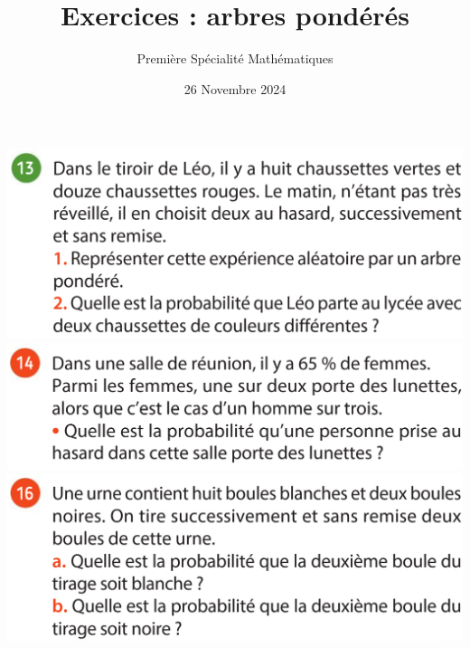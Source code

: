 \documentclass{article}
\title{Exercices : arbres pondérés}
\author{Première Spécialité Mathématiques}
\date{26 Novembre 2024}
\begin{document}
\maketitle

\begin{center}
\includegraphics[width=\textwidth]{Exercice_1.png}
\includegraphics[width=\textwidth]{Exercice_2.png}
\includegraphics[width=\textwidth]{Exercice_3.png}
\end{center}
\end{document}
